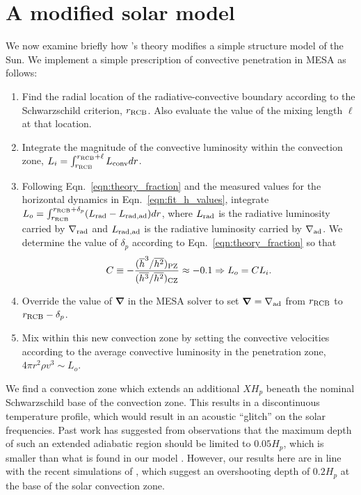 \documentclass{aastex631}
\newcommand{\gradrad}{\ensuremath{\nabla_{\rm{rad}}}}
\newcommand{\gradad}{\ensuremath{\nabla_{\rm{ad}}}}
\renewcommand{\vec}[1]{\boldsymbol{#1}}
\newcommand{\grad}{\vec{\nabla}}
\begin{document}
\section{A modified solar model}
\label{sec:solar_model}
We now examine briefly how \citet{zahn1991}'s theory modifies a simple structure model of the Sun.
We implement a simple prescription of convective penetration in MESA \citep{paxton_etal_2013} as follows:
\begin{enumerate}
\item Find the radial location of the radiative-convective boundary according to the Schwarzschild criterion, $r_{\rm{RCB}}$.
Also evaluate the value of the mixing length $\ell$ at that location.
\item Integrate the magnitude of the convective luminosity within the convection zone, $L_i = \int_{r_{\rm{RCB}}}^{r_{\rm{RCB}} + \ell} L_{\rm{conv}} dr$.
\item Following Eqn.~\ref{eqn:theory_fraction} and the measured values for the horizontal dynamics in Eqn.~\ref{eqn:fit_h_values}, integrate $L_o = \int_{r_{\rm{RCB}}}^{r_{\rm{RCB}} + \delta_p} (L_{\rm{rad}} - L_{\rm{rad,ad}}) dr$, where $L_{\rm{rad}}$ is the radiative luminosity carried by $\gradrad$ and $L_{\rm{rad,ad}}$ is the radiative luminosity carried by $\gradad$.
We determine the value of $\delta_p$ according to Eqn.~\ref{eqn:theory_fraction} so that
\begin{equation}
C \equiv -\frac{(\overline{h}^3/\overline{h^2})_{\rm{PZ}}}{(\overline{h^3}/\overline{h^2})_{\rm{CZ}}} \approx -0.1
\Rightarrow
L_o = C L_i.
\label{eqn:mesa_equation}
\end{equation}
\item Override the value of $\grad$ in the MESA solver to set $\grad = \gradad$ from $r_{\rm{RCB}}$ to $r_{\rm{RCB}} - \delta_p$.
\item Mix within this new convection zone by setting the convective velocities according to the average convective luminosity in the penetration zone, $4\pi r^2 \rho v^3 \sim L_o$.
\end{enumerate}

We find a convection zone which extends an additional $X H_p$ beneath the nominal Schwarzschild base of the convection zone.
This results in a discontinuous temperature profile, which would result in an acoustic ``glitch'' on the solar frequencies.
Past work has suggested from observations that the maximum depth of such an extended adiabatic region should be limited to $0.05 H_p$, which is smaller than what is found in our model \citep[see e.g., section 7.2.1 of][]{basu2016}.
However, our results here are in line with the recent simulations of \citet{kapyla2019}, which suggest an overshooting depth of $0.2 H_p$ at the base of the solar convection zone.
\end{document}
